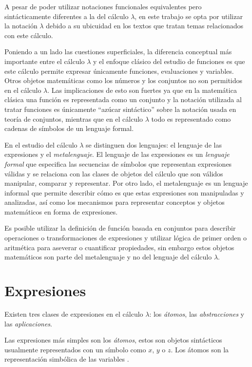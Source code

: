 A pesar de poder utilizar notaciones funcionales equivalentes pero sintácticamente diferentes a la del cálculo $ λ $, en este trabajo se opta por utilizar la notación $ λ $ debido a su ubicuidad en los textos que tratan temas relacionados con este cálculo.

Poniendo a un lado las cuestiones superficiales, la diferencia conceptual más importante entre el cálculo $ λ $ y el enfoque clásico del estudio de funciones es que este cálculo permite expresar únicamente funciones, evaluaciones y variables. Otros objetos matemáticas como los números y los conjuntos no son permitidos en el cálculo $ λ $. Las implicaciones de esto son fuertes ya que en la matemática clásica una función es representada como un conjunto y la notación utilizada al tratar funciones es únicamente ``azúcar sintáctico'' sobre la notación usada en teoría de conjuntos, mientras que en el cálculo $ λ $ todo es representado como cadenas de símbolos de un lenguaje formal.

En el estudio del cálculo $ λ $ se distinguen dos lenguajes: el lenguaje de las expresiones y el \emph{metalenguaje}. El lenguaje de las expresiones es un \emph{lenguaje formal} que especifica las secuencias de símbolos que representan expresiones válidas y se relaciona con las clases de objetos del cálculo que son válidos manipular, comparar y representar. Por otro lado, el metalenguaje es un lenguaje informal que permite describir cómo es que estas expresiones son manipuladas y analizadas, así como los mecanismos para representar conceptos y objetos matemáticos en forma de expresiones.

Es posible utilizar la definición de función basada en conjuntos para describir operaciones o transformaciones de expresiones y utilizar lógica de primer orden o aritmética para aseverar o cuantificar propiedades, sin embargo estos objetos matemáticos son parte del metalenguaje y no del lenguaje del cálculo $ λ $.

\section{Expresiones}
\label{sec:expresiones}

Existen tres clases de expresiones en el cálculo $ λ $: los \emph{átomos}, las \emph{abstracciones} y las \emph{aplicaciones}.

Las expresiones más simples son los \emph{átomos}, estos son objetos sintácticos usualmente representados con un símbolo como $ x $, $ y $ o $ z $. Los átomos son la representación simbólica de las variables \cite[p.~577]{Barendregt:Bible}.

